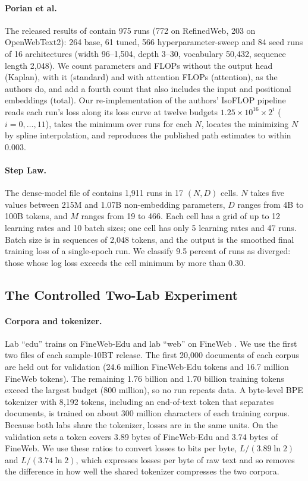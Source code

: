 \paragraph{Porian et al.}
The released results of \citet{porian2024resolving} contain 975 runs (772 on RefinedWeb, 203 on OpenWebText2): 264
base, 61 tuned, 566 hyperparameter-sweep and 84 seed runs of 16 architectures (width 96--1,504, depth 3--30, vocabulary
50,432, sequence length 2,048). We count parameters and FLOPs without the output head (Kaplan), with it (standard) and
with attention FLOPs (attention), as the authors do, and add a fourth count that also includes the input and
positional embeddings (total). Our re-implementation of the authors' IsoFLOP pipeline reads each run's loss along its
loss curve at twelve budgets $1.25\times10^{16}\times2^{i}$ ($i=0,\dots,11$), takes the minimum over runs for each $N$,
locates the minimizing $N$ by spline interpolation, and reproduces the published path estimates to within 0.003.

\paragraph{Step Law.}
The dense-model file of \citet{li2025predictablea} contains 1,911 runs in 17 $(N,D)$ cells. $N$ takes five values
between 215M and 1.07B non-embedding parameters, $D$ ranges from 4B to 100B tokens, and $M$ ranges from 19 to 466. Each
cell has a grid of up to 12 learning rates and 10 batch sizes; one cell has only 5 learning rates and 47 runs. Batch
size is in sequences of 2,048 tokens, and the output is the smoothed final training loss of a single-epoch run. We
classify 9.5 percent of runs as diverged: those whose log loss exceeds the cell minimum by more than 0.30.

\subsection{The Controlled Two-Lab Experiment}\label{app:sweep}

\paragraph{Corpora and tokenizer.}
Lab ``edu'' trains on FineWeb-Edu and lab ``web'' on FineWeb \citep{penedo2024fineweb}. We use the first two
files of each sample-10BT release. The first 20,000 documents of each corpus are held out for validation (24.6 million
FineWeb-Edu tokens and 16.7 million FineWeb tokens). The remaining 1.76 billion and 1.70 billion training tokens exceed
the largest budget (800 million), so no run repeats data. A byte-level BPE tokenizer \citep{sennrich2016neural} with
8,192 tokens, including an end-of-text token that separates documents, is trained on about 300 million characters of
each training corpus. Because both labs share the tokenizer, losses are in the same units. On the validation sets a
token covers 3.89 bytes of FineWeb-Edu and 3.74 bytes of FineWeb. We use these ratios to convert losses to bits per
byte, $L/(3.89\ln2)$ and $L/(3.74\ln2)$, which expresses losses per byte of raw text and so removes the difference in how well the shared tokenizer
compresses the two corpora.

